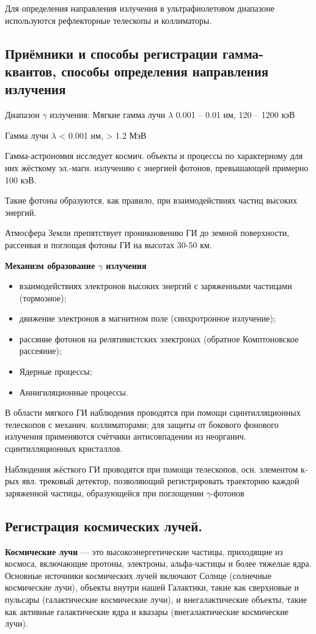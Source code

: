 \documentclass[12pt]{article}
\begin{document}
Для определения направления излучения в ультрафиолетовом диапазоне используются рефлекторные телескопы и коллиматоры.
\subsection{Приёмники и способы регистрации гамма-квантов, способы определения направления излучения}
Диапазон
$\gamma$ излучения:
Мягкие гамма лучи $\lambda$ 0.001 – 0.01 нм,
120 – 1200 кэВ


Гамма лучи
$\lambda$ < 0.001 нм,
> 1.2 МэВ

Гамма-астрономия исследует космич. объекты и процессы по
характерному для них жёсткому эл.-магн. излучению с энергией фотонов,
превышающей примерно 100 кэВ.

Такие фотоны образуются, как правило, при взаимодействиях частиц
высоких энергий.

Атмосфера Земли препятствует проникновению ГИ до земной
поверхности, рассеивая и поглощая фотоны ГИ на высотах 30-50 км.

\textbf{Механизм образование $\gamma$ излучения}
\begin{itemize}
	\item взаимодействиях электронов высоких энергий с заряженными
	частицами (тормозное);
	\item движение электронов в магнитном поле (синхротронное излучение);
	\item рассяние фотонов на релятивистских электронах (обратное
	Комптоновское рассеяние);
	\item Ядерные процессы;
	\item Аннигиляционные процессы.
\end{itemize}

В области мягкого ГИ
наблюдения проводятся при
помощи сцинтилляционных
телескопов с механич.
коллиматорами; для защиты
от бокового фонового
излучения применяются
счётчики антисовпадении из
неорганич. сцинтилляционных
кристаллов.


Наблюдения жёсткого ГИ
проводятся при помощи
телескопов, осн. элементом к-рых
явл. трековый детектор,
позволяющий регистрировать
траекторию каждой заряженной
частицы, образующейся при
поглощении $\gamma$-фотонов
\subsection{Регистрация космических лучей.}
\textbf{Космические лучи} — это высокоэнергетические частицы, приходящие из космоса, включающие протоны, электроны, альфа-частицы и более тяжелые ядра. Основные источники космических лучей включают Солнце (солнечные космические лучи), объекты внутри нашей Галактики, такие как сверхновые и пульсары (галактические космические лучи), и внегалактические объекты, такие как активные галактические ядра и квазары (внегалактические космические лучи).
\end{document}
